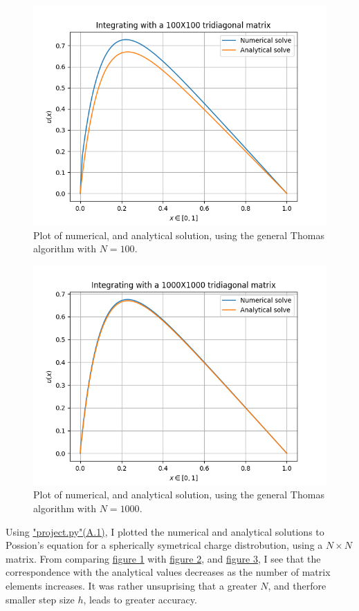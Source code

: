 \documentclass[english,notitlepage,reprint]{revtex4-1}  %
\begin{document}
\begin{figure}[H]
	\centering
	\label{fig:412}
	\includegraphics[width=\columnwidth]{../figures/NumVsAnal100x100.png}
	\caption{Plot of numerical, and analytical solution, using the general Thomas algorithm with
	\(N=100\).}
\end{figure}

\begin{figure}[H]
	\centering
	\label{fig:413}
	\includegraphics[width=\columnwidth]{../figures/NumVsAnal1000x1000.png}
	\caption{Plot of numerical, and analytical solution, using the general Thomas algorithm with
	\(N=1000\).}
\end{figure}
Using \hyperref[A:1]{"project.py"(A.1)}, I plotted the numerical and analytical solutions to Possion's equation for a spherically symetrical charge distrobution, using a \(N\times N\) matrix. From comparing \hyperref[fig:411]{figure 1} with \hyperref[fig:412]{figure 2}, and \hyperref[fig:413]{figure 3}, I see that the correspondence with the analytical values decreases as the number of matrix elements increases. It was rather unsuprising that a greater \(N\), and therfore smaller step size \(h\), leads to greater accuracy.
\end{document}
